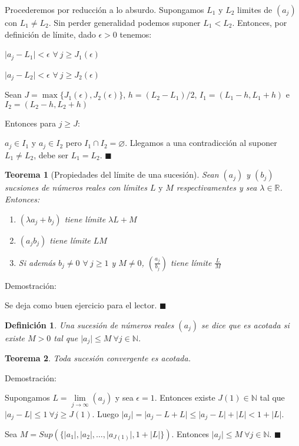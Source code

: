 \documentclass[12pt]{book}
\newcommand\R{{\mathbb R}}
\newcommand\N{{\mathbb N}}
\providecommand{\abs}[1]{\lvert#1\rvert}
\newtheorem{teo}{Teorema}[section]
\newtheorem{defi}{Definición}[section]
\begin{document}
Procederemos por reducción a lo absurdo. Supongamos $L_1 \mbox{ y }L_2$ limites de $(a_j)$ con $L_1 \neq L_2$. Sin perder generalidad podemos suponer $L_1<L_2$. Entonces, por definición de límite, dado $\epsilon>0$ tenemos:

$\abs{a_j-L_1}<\epsilon$ $\forall \ j\ge J_1(\epsilon)$

$\abs{a_j-L_2}<\epsilon$ $\forall \ j\ge J_2(\epsilon)$

Sean $J=\max\{J_1(\epsilon),J_2(\epsilon)\}$, $h=(L_2-L_1)/2$, $I_1=(L_1-h,L_1+h)$ e $I_2=(L_2-h,L_2+h)$

Entonces para $j \ge J$:

$a_j \in I_1$ y $a_j \in I_2$ pero $I_1 \cap I_2 = \varnothing$. Llegamos a una contradicción al suponer $L_1 \neq L_2$, debe ser $L_1 = L_2$. $\blacksquare$
\begin{teo}[Propiedades del límite de una sucesión]\rm\label{PropiedadesLimiteSucesion}
Sean $(a_j)$ y $(b_j)$ sucsiones de números reales con límites $L \mbox{ y } M$ respectivamentes y sea $\lambda \in \R$. Entonces:
\begin{enumerate}
    \item $(\lambda a_j+b_j)$ tiene límite $\lambda L+M$ 
    \item $(a_jb_j)$ tiene límite $LM$
    \item Si además $b_j \neq 0$ $\forall \ j \ge 1$ y $M \neq 0$, $(\frac{a_j}{b_j})$ tiene límite $\frac{L}{M}$
\end{enumerate}
\end{teo}
Demostración:

Se deja como buen ejercicio para el lector. $\blacksquare$
\begin{defi}\rm
Una sucesión de números reales $(a_j)$ se dice que es acotada si existe $M>0$ tal que $\abs{a_j} \le M \ \forall{j \in \N}$.
\end{defi}
\begin{teo}\rm
Toda sucesión convergente es acotada.
\end{teo}
Demostración:

Supongamos $L= \lim\limits_{j\to\infty}(a_{j})$ y sea $\epsilon=1$. Entonces existe $J(1) \in \N$ tal que $\abs{a_j-L} \le 1 \ \forall{j \ge J(1)}$. Luego $\abs{a_j} = \abs{a_j-L+L} \le \abs{a_j-L}+\abs{L} < 1+\abs{L}$.

Sea $M=Sup(\{ \abs{a_1},\abs{a_2},\dots,\abs{a_{J(1)}},1+\abs{L} \})$. Entonces $\abs{a_j} \le M \ \forall{j \in \N}$. $\blacksquare$
\end{document}
